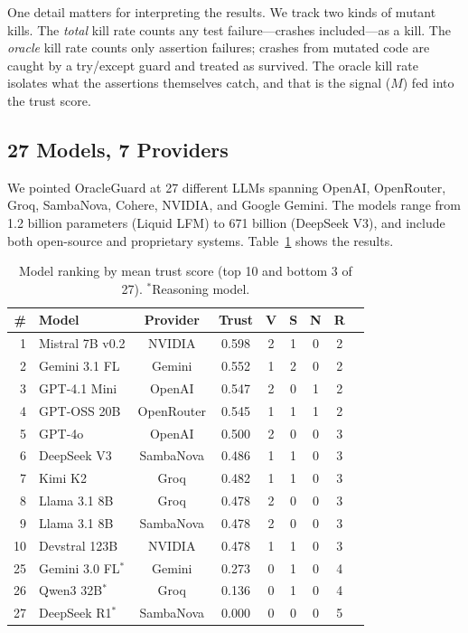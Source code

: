 \documentclass[conference]{IEEEtran}
\begin{document}
One detail matters for interpreting the results. We track two kinds of mutant kills. The \emph{total} kill rate counts any test failure---crashes included---as a kill. The \emph{oracle} kill rate counts only assertion failures; crashes from mutated code are caught by a try/except guard and treated as survived. The oracle kill rate isolates what the assertions themselves catch, and that is the signal ($M$) fed into the trust score.

\subsection{27 Models, 7 Providers}

We pointed OracleGuard at 27 different LLMs spanning OpenAI, OpenRouter, Groq, SambaNova, Cohere, NVIDIA, and Google Gemini. The models range from 1.2 billion parameters (Liquid LFM) to 671 billion (DeepSeek V3), and include both open-source and proprietary systems. Table~\ref{tab:models} shows the results.

\begin{table}[t]
\centering
\caption{Model ranking by mean trust score (top 10 and bottom 3 of 27). $^*$Reasoning model.}
\label{tab:models}
\small
\begin{tabular}{rlccccccc}
\toprule
\# & \textbf{Model} & \textbf{Provider} & \textbf{Trust} & \textbf{V} & \textbf{S} & \textbf{N} & \textbf{R} \\
\midrule
1 & Mistral 7B v0.2 & NVIDIA & 0.598 & 2 & 1 & 0 & 2 \\
2 & Gemini 3.1 FL & Gemini & 0.552 & 1 & 2 & 0 & 2 \\
3 & GPT-4.1 Mini & OpenAI & 0.547 & 2 & 0 & 1 & 2 \\
4 & GPT-OSS 20B & OpenRouter & 0.545 & 1 & 1 & 1 & 2 \\
5 & GPT-4o & OpenAI & 0.500 & 2 & 0 & 0 & 3 \\
6 & DeepSeek V3 & SambaNova & 0.486 & 1 & 1 & 0 & 3 \\
7 & Kimi K2 & Groq & 0.482 & 1 & 1 & 0 & 3 \\
8 & Llama 3.1 8B & Groq & 0.478 & 2 & 0 & 0 & 3 \\
9 & Llama 3.1 8B & SambaNova & 0.478 & 2 & 0 & 0 & 3 \\
10 & Devstral 123B & NVIDIA & 0.478 & 1 & 1 & 0 & 3 \\
\midrule
25 & Gemini 3.0 FL$^*$ & Gemini & 0.273 & 0 & 1 & 0 & 4 \\
26 & Qwen3 32B$^*$ & Groq & 0.136 & 0 & 1 & 0 & 4 \\
27 & DeepSeek R1$^*$ & SambaNova & 0.000 & 0 & 0 & 0 & 5 \\
\bottomrule
\end{tabular}
\end{table}
\end{document}

